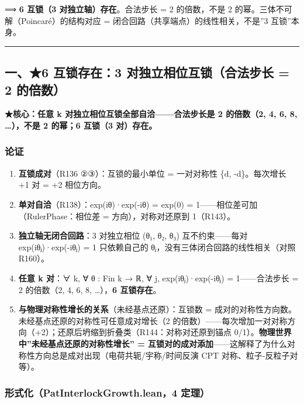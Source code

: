 \documentclass[
]{article}
\providecommand{\tightlist}{%
  \setlength{\itemsep}{0pt}\setlength{\parskip}{0pt}}
\begin{document}
⟹ \textbf{6 互锁（3 对独立轴）存在}。合法步长 = 2 的倍数，不是 2
的幂。三体不可解（Poincaré）的结构对应 =
闭合回路（共享端点）的线性相关，不是''3 互锁''本身。

\begin{center}\rule{0.5\linewidth}{0.5pt}\end{center}

\subsection{一、★6 互锁存在：3 对独立相位互锁（合法步长 = 2
的倍数）}\label{ux4e006-ux4e92ux9501ux5b58ux57283-ux5bf9ux72ecux7acbux76f8ux4f4dux4e92ux9501ux5408ux6cd5ux6b65ux957f-2-ux7684ux500dux6570}

\textbf{★核心：任意 k 对独立相位互锁全部自洽------合法步长是 2
的倍数（2, 4, 6, 8, \ldots），不是 2 的幂；6 互锁（3 对）存在。}

\subsubsection{论证}\label{ux8bbaux8bc1}

\begin{enumerate}
\def\labelenumi{\arabic{enumi}.}
\tightlist
\item
  \textbf{互锁成对}（R136 ②③）：互锁的最小单位 = 一对对称性 \{d,
  -d\}。每次增长 +1 对 = +2 相位方向。
\item
  \textbf{单对自洽}（R138）：exp(iθ)·exp(-iθ) = exp(0) =
  1------相位差可加（RulerPhase：相位差 = 方向），对称对还原到
  1（R143）。
\item
  \textbf{独立轴无闭合回路}：3 对独立相位 (θ₁, θ₂, θ₃)
  互不约束------每对 exp(iθⱼ)·exp(-iθⱼ) = 1 只依赖自己的
  θⱼ，没有三体闭合回路的线性相关（对照 R160）。
\item
  \textbf{任意 k 对}：∀ k, ∀ θ : Fin k → ℝ, ∀ j, exp(iθⱼ)·exp(-iθⱼ) =
  1------合法步长 = 2 的倍数（2, 4, 6, 8, \ldots），\textbf{6
  互锁存在}。
\item
  \textbf{与物理对称性增长的关系}（未经基点还原）：互锁数 =
  成对的对称性方向数。未经基点还原的对称性可任意成对增长（2
  的倍数）------每次增加一对对称方向（+2）；还原后坍缩到折叠类（R144：对称对还原到锚点
  0/1）。\textbf{物理世界中''未经基点还原的对称性增长'' =
  互锁对的成对添加}------这解释了为什么对称性方向总是成对出现（电荷共轭/宇称/时间反演
  CPT 对称、粒子-反粒子对等）。
\end{enumerate}

\subsubsection{形式化（PatInterlockGrowth.lean，4
定理）}\label{ux5f62ux5f0fux5316patinterlockgrowth.lean4-ux5b9aux7406}
\end{document}
